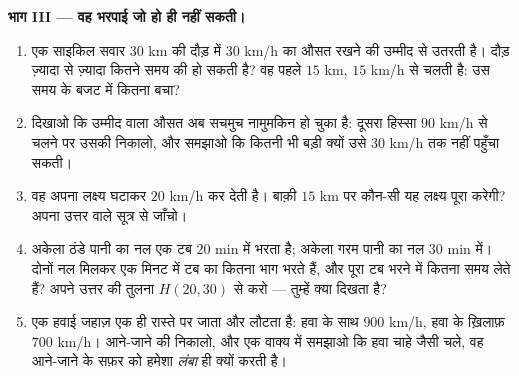 \begin{problem}
\medskip
\noindent\textbf{भाग III --- वह भरपाई जो हो ही नहीं सकती।}
\begin{enumerate}[resume]
  \item एक साइकिल सवार $30$ km की दौड़ में $30$ km/h का औसत रखने की
        उम्मीद से उतरती है। दौड़ ज़्यादा से ज़्यादा कितने समय की हो
        सकती है? वह पहले $15$ km, $15$ km/h से चलती है: उस समय के
        बजट में कितना बचा?
  \item दिखाओ कि उम्मीद वाला औसत अब सचमुच नामुमकिन हो चुका है:
        दूसरा  हिस्सा $90$ km/h से चलने पर उसकी 
        निकालो, और समझाओ कि कितनी भी बड़ी  क्यों उसे $30$ km/h
        तक नहीं पहुँचा सकती।
  \item वह अपना लक्ष्य घटाकर $20$ km/h कर देती है। बाक़ी $15$ km
        पर कौन-सी  यह लक्ष्य पूरा करेगी? अपना उत्तर  वाले सूत्र से जाँचो।
  \item अकेला ठंडे पानी का नल एक टब $20$ min में भरता है; अकेला
        गरम पानी का नल $30$ min में। दोनों नल मिलकर एक मिनट में
        टब का कितना भाग भरते हैं, और पूरा टब भरने में कितना समय
        लेते हैं? अपने उत्तर की तुलना $H(20, 30)$ से करो ---
        तुम्हें क्या दिखता है?
  \item एक हवाई जहाज़ एक ही रास्ते पर जाता और लौटता है: हवा के साथ
        $900$ km/h, हवा के ख़िलाफ़ $700$ km/h। आने-जाने की 
        निकालो, और एक वाक्य में समझाओ कि हवा चाहे जैसी चले, वह
        आने-जाने के सफ़र को हमेशा \emph{लंबा} ही क्यों करती है।
\end{enumerate}
\end{problem}

